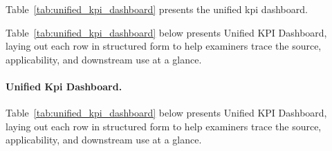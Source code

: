 {\tablestripes\tablefontsize

\noindent Table~\ref{tab:unified_kpi_dashboard} presents the unified kpi dashboard.


\noindent Table~\ref{tab:unified_kpi_dashboard} below presents Unified KPI Dashboard, laying out each row in structured form to help examiners trace the source, applicability, and downstream use at a glance. %
\paragraph{Unified Kpi Dashboard.} %
\noindent Table~\ref{tab:unified_kpi_dashboard} below presents Unified KPI Dashboard, laying out each row in structured form to help examiners trace the source, applicability, and downstream use at a glance. %



}
